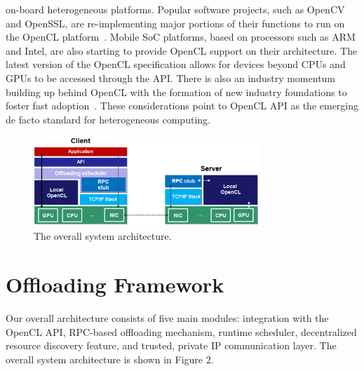 \documentclass[10pt, conference, compsocconf]{IEEEtran}
\begin{document}
on-board heterogeneous platforms.
%
Popular software projects, such as OpenCV and OpenSSL, are re-implementing
major portions of their functions to run on the OpenCL
platform~\cite{opencv}.
%
Mobile SoC platforms, based on processors such as ARM and Intel, are also 
starting to provide OpenCL support on their architecture.
%
The latest version of the OpenCL specification allows for devices beyond 
CPUs and GPUs to be accessed through the API. 
%
There is also an industry momentum building up behind OpenCL with the
formation of new industry foundations to foster fast adoption~\cite{hsa}. 
%
These considerations point to OpenCL API as the emerging de facto standard 
for heterogeneous computing.
%
\begin{figure}
\centering
\includegraphics[height=3.4cm, width=8.5cm]{Figure/architecture}
\caption{The overall system architecture.}
\end{figure}
%
\section{Offloading Framework}
%
Our overall architecture consists of five main modules: integration with the 
OpenCL API, RPC-based offloading mechanism, runtime scheduler, decentralized resource discovery 
feature, and trusted, private IP communication layer.
%
The overall system architecture is shown in Figure 2.
%
\end{document}
